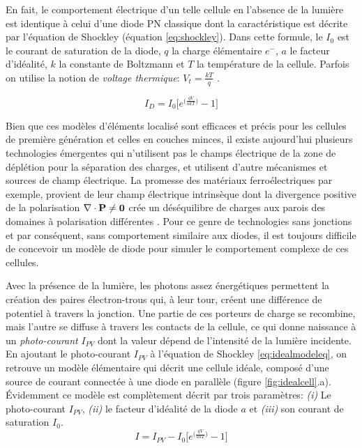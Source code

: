 En fait, le comportement électrique d'un telle cellule en l'absence de la lumière est identique à celui d'une diode PN classique dont la caractéristique est décrite par l'équation de Shockley \cite{Shockley1949} (équation \ref{eq:shockley}). Dans cette formule, le $I_0$  est le courant de saturation de la diode, $q$  la charge élémentaire $e^{-}$, $a$ le facteur d'idéalité, $k$ la constante de Boltzmann  et $T$  la température de la cellule. Parfois on utilise la notion de \textit{voltage thermique}: $V_t = \frac{kT}{q}$ .

\begin{equation}
\label{eq:shockley}
  I_D = I_0 \bigg[e^{\big(\frac{qV}{akT}\big)} - 1\bigg]
\end{equation}

Bien que ces modèles d'éléments localisé sont efficaces et précis pour les cellules de première génération et celles en couches minces, il existe aujourd'hui plusieurs technologies émergentes qui n'utilisent pas le champs électrique de la zone de déplétion pour la séparation des charges, et utilisent d'autre mécanismes et sources de champ électrique. La promesse des matériaux ferroélectriques par exemple, provient de leur champ électrique intrinsèque dont la divergence positive de la polarisation $\nabla \cdot \bf{P} \neq 0$ crée un déséquilibre de charges aux parois des domaines à polarisation différentes \cite{Huang2010}. Pour ce genre de technologies sans jonctions et par conséquent, sans comportement similaire aux diodes, il est toujours difficile de concevoir un modèle de diode pour simuler le comportement complexe de ces cellules.

Avec la présence de la lumière, les photons assez énergétiques permettent la création des paires électron-trous qui, à leur tour, créent une différence de potentiel à travers la jonction. Une partie de ces porteurs de charge se recombine, mais l'autre se diffuse à travers les contacts de la cellule, ce qui donne naissance à un \textit{photo-courant} $I_{PV}$  dont la valeur dépend de l'intensité de la lumière incidente.\\
En ajoutant le photo-courant $I_{PV}$ à l'équation de Shockley \ref{eq:idealmodeleq}, on retrouve un modèle élémentaire qui décrit une cellule idéale, composé d'une source de courant connectée à une diode en parallèle (figure \ref{fig:idealcell}.a). Évidemment ce modèle est complètement décrit par trois paramètres: \textit{(i)} Le photo-courant $I_{PV}$, \textit{(ii)} le facteur d'idéalité de la diode $a$ et \textit{(iii)} son courant de saturation $I_0$. 
\begin{equation}
\label{eq:idealmodeleq}
  I = I_{PV} - I_0 \bigg[e^{\big(\frac{qV}{akT}\big)} - 1\bigg]
\end{equation}

